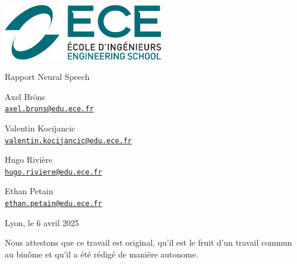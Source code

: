 \documentclass[a4paper,11pt]{article}
\begin{document}
\begin{titlepage}
    \noindent
    \begin{center}
        \centering
        \includegraphics[width=7cm]{images/ece.png} %
    \end{center}
	\vfill
	
	\vspace{1cm}
	\makebox[\linewidth]{\rule{\textwidth}{0.4pt}} %
    
    \centering
    {\Huge Rapport Neural Speech\par}
    
    \makebox[\linewidth]{\rule{\textwidth}{0.4pt}} %
    \vspace{1cm}	
	
    \begin{minipage}[t]{0.45\textwidth}
        \centering
        {\Large Axel Bröns \\ \texttt{\href{mailto:axel.brons@edu.ece.fr}{axel.brons@edu.ece.fr}}}
    \end{minipage}
    \hfill
    \begin{minipage}[t]{0.45\textwidth}
    	\centering
        {\Large Valentin Kocijancic \\ \texttt{\href{mailto:valentin.kocijancic@edu.ece.fr}{valentin.kocijancic@edu.ece.fr}}}
    \end{minipage}   
    \vfill
    \begin{minipage}[t]{0.45\textwidth}
        \centering
        {\Large Hugo Rivière \\ \texttt{\href{mailto:hugo.riviere@edu.ece.fr}{hugo.riviere@edu.ece.fr}}}
    \end{minipage}
    \hfill
    \begin{minipage}[t]{0.45\textwidth}
    	\centering
        {\Large Ethan Petain \\ \texttt{\href{mailto:ethan.petain@edu.ece.fr}{ethan.petain@edu.ece.fr}}}
    \end{minipage}  
    
    
    
    \vfill
    {\large Lyon, le 6 avril 2025\par}
    \vspace{1cm}
    {\normalsize Nous attestons que ce travail est original, qu’il est le fruit d’un travail commun au binôme et qu’il a été rédigé de manière autonome.\par}
\end{titlepage}
\end{document}
